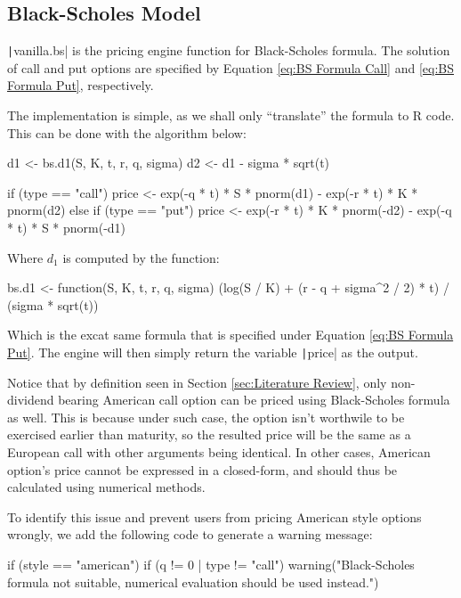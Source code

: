 \subsection{Black-Scholes Model}

\texttt|vanilla.bs| is the pricing engine function for Black-Scholes formula. The solution of call and put options are specified by Equation \ref{eq:BS Formula Call} and \ref{eq:BS Formula Put}, respectively.

The implementation is simple, as we shall only ``translate'' the formula to R code. This can be done with the algorithm below:

\begin{Rminted}
d1 <- bs.d1(S, K, t, r, q, sigma)
d2 <- d1 - sigma * sqrt(t)

if (type == "call") {
    price <- exp(-q * t) * S * pnorm(d1) - exp(-r * t) * K * pnorm(d2)
} else if (type == "put") {
    price <- exp(-r * t) * K * pnorm(-d2) - exp(-q * t) * S * pnorm(-d1)
}
\end{Rminted}

Where $d_1$ is computed by the function:

\begin{Rminted}
bs.d1 <- function(S, K, t, r, q, sigma) {
    (log(S / K) + (r - q + sigma^2 / 2) * t) / (sigma * sqrt(t))
}
\end{Rminted}

Which is the excat same formula that is specified under Equation \ref{eq:BS Formula Put}. The engine will then simply return the variable \texttt|price| as the output.

Notice that by definition seen in Section \ref{sec:Literature Review}, only non-dividend bearing American call option can be priced using Black-Scholes formula as well. This is because under such case, the option isn't worthwile to be exercised earlier than maturity, so the resulted price will be the same as a European call with other arguments being identical. In other cases, American option's price cannot be expressed in a closed-form, and should thus be calculated using numerical methods.

To identify this issue and prevent users from pricing American style options wrongly, we add the following code to generate a warning message:

\begin{Rminted}
if (style == "american") {
    if (q != 0 | type != "call") {
        warning("Black-Scholes formula not suitable, numerical evaluation should be used instead.")
    }
}
\end{Rminted}


